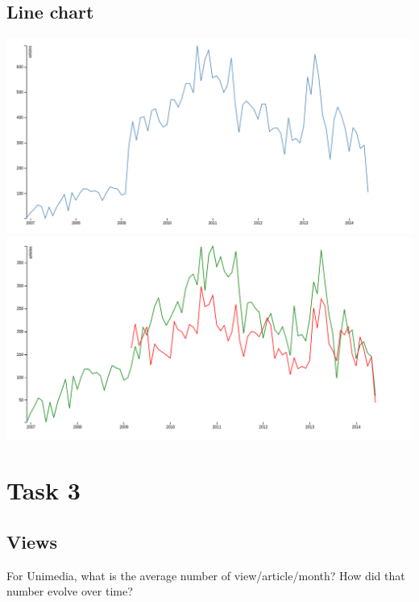 \documentclass[12pt,a4paper]{article}
\begin{document}
\subsection*{Line chart}
\begin{center}
 \includegraphics[width=6in]{Lab3d1.png}
 \includegraphics[width=6in]{Lab3d2.png}
\end{center}


\section*{Task 3}
 \subsection*{Views}
 For Unimedia, what is the average number of view/article/month? How did
that number evolve over time?
\end{document}
